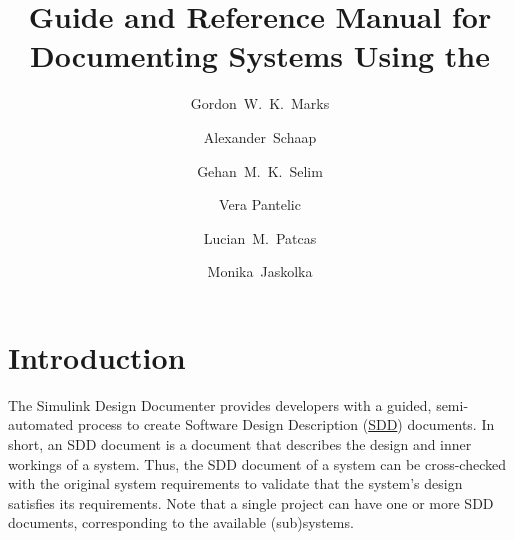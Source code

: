\documentclass{mcscert}
\title{Guide and Reference Manual for Documenting \simulink{} Systems Using the \sddtool{}}
\author{Gordon~W.~K.~Marks \and Alexander~Schaap  \and Gehan~M.~K.~Selim \and Vera Pantelic \and Lucian~M.~Patcas \and Monika~Jaskolka}
\institute{McMaster Centre for Software Certification (McSCert), McMaster University, Hamilton, Ontario, Canada}
\newcommand{\sddtool}{Simulink Design Documenter}
\begin{document}
  \maketitle
  \tableofcontents


\chapter{Introduction}
\label{ch:introduction}
The \sddtool{} provides \simulink{} developers with a guided, 
semi-automated process to create Software Design Description 
(\hyperref[acr:sdd]{SDD}) documents. 
In short, an SDD document is a document that describes the design and inner 
workings of a \simulink{} system. 
Thus, the SDD document of a \simulink{} system can be cross-checked with the 
original system requirements to validate that the system's design satisfies its 
requirements. 
Note that a single project can have one or more SDD documents, 
corresponding to the available (sub)systems. 
  
\end{document}

